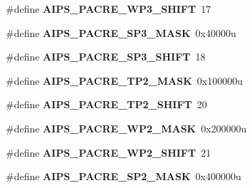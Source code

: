 \begin{DoxyCompactItemize}
\item 
\#define {\bfseries A\+I\+P\+S\+\_\+\+P\+A\+C\+R\+E\+\_\+\+W\+P3\+\_\+\+S\+H\+I\+FT}~17\hypertarget{group__AIPS__Register__Masks_ga6a59f86b0fa98088b2805b5e911c8188}{}\label{group__AIPS__Register__Masks_ga6a59f86b0fa98088b2805b5e911c8188}

\item 
\#define {\bfseries A\+I\+P\+S\+\_\+\+P\+A\+C\+R\+E\+\_\+\+S\+P3\+\_\+\+M\+A\+SK}~0x40000u\hypertarget{group__AIPS__Register__Masks_gae6d9b77a59b50ae6d499d23d740493f1}{}\label{group__AIPS__Register__Masks_gae6d9b77a59b50ae6d499d23d740493f1}

\item 
\#define {\bfseries A\+I\+P\+S\+\_\+\+P\+A\+C\+R\+E\+\_\+\+S\+P3\+\_\+\+S\+H\+I\+FT}~18\hypertarget{group__AIPS__Register__Masks_ga0be66b8fe37446b3aa317259099348d1}{}\label{group__AIPS__Register__Masks_ga0be66b8fe37446b3aa317259099348d1}

\item 
\#define {\bfseries A\+I\+P\+S\+\_\+\+P\+A\+C\+R\+E\+\_\+\+T\+P2\+\_\+\+M\+A\+SK}~0x100000u\hypertarget{group__AIPS__Register__Masks_gac886e6e40113092b7fd454edb0df9f77}{}\label{group__AIPS__Register__Masks_gac886e6e40113092b7fd454edb0df9f77}

\item 
\#define {\bfseries A\+I\+P\+S\+\_\+\+P\+A\+C\+R\+E\+\_\+\+T\+P2\+\_\+\+S\+H\+I\+FT}~20\hypertarget{group__AIPS__Register__Masks_gab8ec47c762babccfcbd072534c5d89e9}{}\label{group__AIPS__Register__Masks_gab8ec47c762babccfcbd072534c5d89e9}

\item 
\#define {\bfseries A\+I\+P\+S\+\_\+\+P\+A\+C\+R\+E\+\_\+\+W\+P2\+\_\+\+M\+A\+SK}~0x200000u\hypertarget{group__AIPS__Register__Masks_ga4484064537555aa3ca213387cb8402cc}{}\label{group__AIPS__Register__Masks_ga4484064537555aa3ca213387cb8402cc}

\item 
\#define {\bfseries A\+I\+P\+S\+\_\+\+P\+A\+C\+R\+E\+\_\+\+W\+P2\+\_\+\+S\+H\+I\+FT}~21\hypertarget{group__AIPS__Register__Masks_gaafcca6383b332c9651dcbbdbf1f0cced}{}\label{group__AIPS__Register__Masks_gaafcca6383b332c9651dcbbdbf1f0cced}

\item 
\#define {\bfseries A\+I\+P\+S\+\_\+\+P\+A\+C\+R\+E\+\_\+\+S\+P2\+\_\+\+M\+A\+SK}~0x400000u\hypertarget{group__AIPS__Register__Masks_ga18dc4372da0063d02945dae766caea0d}{}\label{group__AIPS__Register__Masks_ga18dc4372da0063d02945dae766caea0d}


\end{DoxyCompactItemize}
